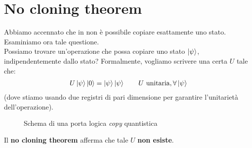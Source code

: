 \documentclass[../../InformazioneQuantistica.tex]{subfiles}
\begin{document}
\section{No cloning theorem}
Abbiamo accennato che in \MQ non è possibile copiare esattamente uno stato. Esaminiamo ora tale questione.\\

Possiamo trovare un'operazione che possa copiare uno stato $\Ket{\psi}$, indipendentemente dallo stato? Formalmente, vogliamo scrivere una certa $U$ tale che:
\begin{align}
U\Ket{\psi}\Ket{0} = \Ket{\psi}\Ket{\psi} \qquad U \text{ unitaria}, \forall \Ket{\psi} \label{eqn:Ucopy}
\end{align}
(dove stiamo usando due registri di pari dimensione per garantire l'unitarietà dell'operazione).

\begin{figure}[H]
\centering

\caption{Schema di una porta logica \textit{copy} quantistica\label{fig:copy-mq}}
\end{figure}

Il \textbf{no cloning theorem} afferma che tale $U$ \textbf{non esiste}.\\
\end{document}
